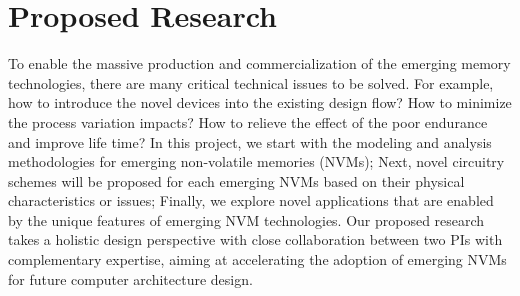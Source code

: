 \section{Proposed Research}
To enable the massive production and commercialization of the emerging memory technologies, there are many critical technical issues to be solved. For example, how to introduce the novel devices into the existing design flow? How to minimize the process variation impacts? How to relieve the effect of the poor endurance and improve life time? In this project, we start with the modeling and analysis methodologies for emerging non-volatile memories (NVMs); Next, novel circuitry schemes will be proposed for each emerging NVMs based on their physical characteristics or issues; Finally, we explore novel applications that are enabled by the unique  features of emerging NVM technologies. Our proposed research takes a holistic design perspective with close collaboration between two PIs with complementary expertise, aiming at accelerating the adoption of emerging NVMs for future computer architecture design.



%


